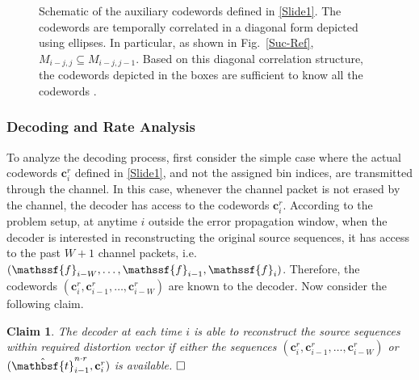 \documentclass[journal, twocolumn, 10pt]{IEEEtran}
\newtheorem{claim}{Claim}
\newcommand{\bc}{{\mathbf{c}}}
\newcommand{\rvf}{{\mathssf{f}}}    %
\newcommand{\rvbt}{{\mathbsf{t}}}
\begin{document}
{\begin{figure}
\begin{center}
\caption{{Schematic of the auxiliary codewords defined in \eqref{Slide1}. The codewords are temporally correlated in a diagonal form depicted using ellipses. In particular, as shown in Fig.~\ref{Suc-Ref}, $M_{i-j,j} \subseteq M_{i-j,j-1}$. Based on this diagonal correlation structure, the codewords depicted in the boxes are sufficient to know all the codewords .}}
\label{Layer}
\end{center}
\end{figure}

\subsubsection{Decoding and Rate Analysis}
{
To analyze the decoding process, first consider the simple case where the actual codewords $\bc^r_{i}$ defined in \eqref{Slide1}, and not the assigned bin indices, are transmitted through the channel. In this case, whenever the channel packet is not erased by the channel, the decoder has access to the codewords $\bc^r_{i}$. According to the problem setup, at anytime $i$ outside the error propagation window, when the decoder is interested in reconstructing the original source sequences, it has access to the past $W+1$ channel packets, i.e. $(\rvf_{i-W}, \ldots, \rvf_{i-1}, \rvf_{i})$. Therefore, the codewords $(\bc^r_{i}, \bc^r_{i-1},\ldots, \bc^r_{i-W})$ are known to the decoder. Now consider the following claim. 

\begin{claim}
\label{Claim}
The decoder at each time $i$ is able to reconstruct the source sequences within required distortion vector if either the sequences $(\bc^r_{i}, \bc^r_{i-1},\ldots, \bc^r_{i-W})$ or $(\hat{\rvbt}^{n\cdot r}_{i-1}, \bc^{r}_{i})$ is available.
$\hfill\Box$
\end{claim}

}}
\end{document}
